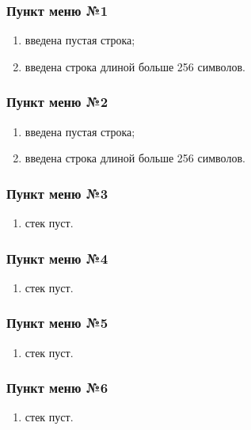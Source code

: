 \documentclass[a4paper,12pt]{extarticle}
\begin{document}
\subsubsection{Пункт меню №1}
\begin{enumerate}
    \item введена пустая строка;
    \item введена строка длиной больше 256 символов.
\end{enumerate}

\subsubsection{Пункт меню №2}
\begin{enumerate}
    \item введена пустая строка;
    \item введена строка длиной больше 256 символов.
\end{enumerate}

\subsubsection{Пункт меню №3}
\begin{enumerate}
    \item стек пуст.
\end{enumerate}

\subsubsection{Пункт меню №4}
\begin{enumerate}
    \item стек пуст.
\end{enumerate}

\subsubsection{Пункт меню №5}
\begin{enumerate}
    \item стек пуст.
\end{enumerate}

\subsubsection{Пункт меню №6}
\begin{enumerate}
    \item стек пуст.
\end{enumerate}
\end{document}

